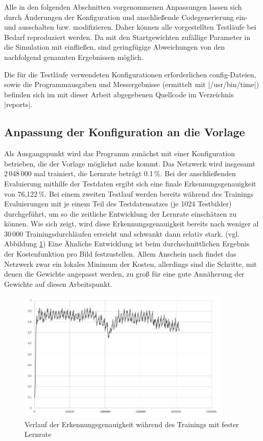 \documentclass[../main.tex]{subfiles}
\begin{document}
Alle in den folgenden Abschnitten vorgenommenen Anpassungen lassen sich durch Änderungen der Konfiguration und anschließende Codegenerierung ein- und ausschalten bzw. modifizieren. Daher können alle vorgestellten Testläufe bei Bedarf reproduziert werden. Da mit den Startgewichten zufällige Parameter in die Simulation mit einfließen, sind geringfügige Abweichungen von den nachfolgend genannten Ergebnissen möglich. 

Die für die Testläufe verwendeten Konfigurationen erforderlichen config-Dateien, sowie die Programmausgaben und Messergebnisse (ermittelt mit |/usr/bin/time|) befinden sich im mit dieser Arbeit abgegebenen Quellcode im Verzeichnis |reports|. 

\subsection{Anpassung der Konfiguration an die Vorlage}
Als Ausgangspunkt wird das Programm zunächst mit einer Konfiguration betrieben, die der Vorlage möglichst nahe kommt. Das Netzwerk wird insgesamt 2\,048\,000 mal trainiert, die Lernrate beträgt 0.1\,\%.  Bei der anschließenden Evaluierung mithilfe der Testdaten ergibt sich eine finale Erkennungsgenauigkeit von 76,122\,\%. Bei einem zweiten Testlauf werden bereits während des Trainings Evaluierungen mit je einem Teil des Testdatensatzes (je 1024 Testbilder) durchgeführt, um so die zeitliche Entwicklung der Lernrate einschätzen zu können. Wie sich zeigt, wird diese Erkennungsgenauigkeit bereits nach weniger al 30\,000 Trainingsdurchläufen erreicht und schwankt dann relativ stark. (vgl. Abbildung \ref{pic:diagram_lr_fixed}) Eine Ähnliche Entwicklung ist beim durchschnittlichen Ergebnis der Kostenfunktion pro Bild festzustellen. Allem Anschein nach findet das Netzwerk zwar ein lokales Minimum der Kosten, allerdings sind die Schritte, mit denen die Gewichte angepasst werden, zu groß für eine gute Annäherung der Gewichte auf diesen Arbeitspunkt. 
\begin{figure}
	\centering 
	\includegraphics[width=0.9\textwidth]{../images/Schmidt/fixed_lr.jpg} 
	\caption {Verlauf der Erkennungsgenauigkeit während des Trainings mit fester Lernrate} 
	\label{pic:diagram_lr_fixed} 
\end{figure} 
\end{document}
